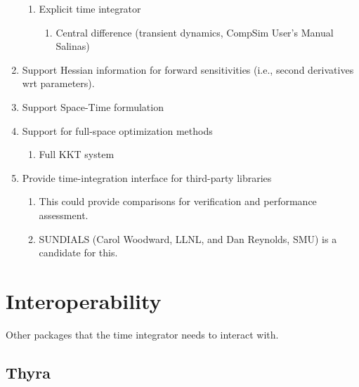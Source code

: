 \begin{enumerate}
\begin{enumerate}
\item Explicit time integrator

\begin{enumerate}
\item Central difference (transient dynamics, CompSim User's Manual Salinas)
\end{enumerate}
\end{enumerate}
\item Support Hessian information for forward sensitivities (i.e., second
derivatives wrt parameters).
\item Support Space-Time formulation
\item Support for full-space optimization methods

\begin{enumerate}
\item Full KKT system
\end{enumerate}
\item Provide time-integration interface for third-party libraries

\begin{enumerate}
\item This could provide comparisons for verification and performance assessment.
\item SUNDIALS (Carol Woodward, LLNL, and Dan Reynolds, SMU) is a candidate
for this.
\end{enumerate}
\end{enumerate}

\section{Interoperability}

Other packages that the time integrator needs to interact with.


\subsection{Thyra}


